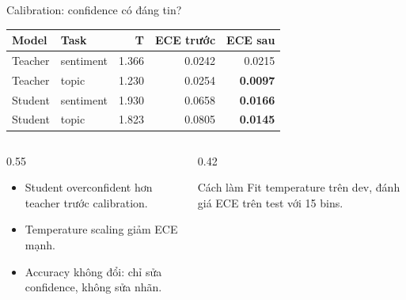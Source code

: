 \documentclass[aspectratio=169,11pt]{beamer}
\newcommand{\good}[1]{\textcolor{sgublue}{\textbf{#1}}}
\begin{document}
\begin{frame}{Calibration: confidence có đáng tin?}
\small
\begin{center}
\begin{tabular}{@{}llrrr@{}}
\toprule
Model & Task & T & ECE trước & ECE sau \\
\midrule
Teacher & sentiment & 1.366 & 0.0242 & 0.0215 \\
Teacher & topic & 1.230 & 0.0254 & \good{0.0097} \\
Student & sentiment & 1.930 & 0.0658 & \good{0.0166} \\
Student & topic & 1.823 & 0.0805 & \good{0.0145} \\
\bottomrule
\end{tabular}
\end{center}

\vspace{0.2cm}
\begin{columns}[T]
\begin{column}{0.55\textwidth}
\begin{itemize}
  \item Student overconfident hơn teacher trước calibration.
  \item Temperature scaling giảm ECE mạnh.
  \item Accuracy không đổi: chỉ sửa confidence, không sửa nhãn.
\end{itemize}
\end{column}
\begin{column}{0.42\textwidth}
\begin{block}{Cách làm}
Fit temperature trên dev, đánh giá ECE trên test với 15 bins.
\end{block}
\end{column}
\end{columns}
\end{frame}
\end{document}
